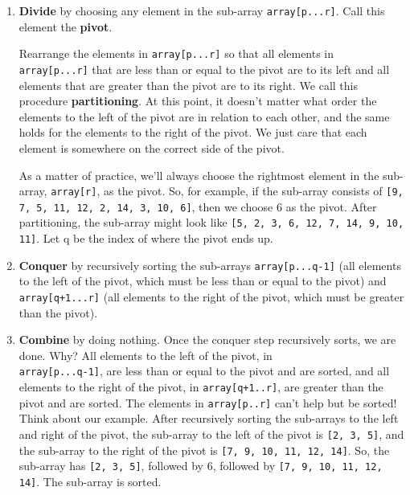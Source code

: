 \documentclass[a4paper,12pt]{article}
\theoremstyle{definition}
\begin{document}
    \begin{enumerate}
        \item
        \textbf{Divide} by choosing any element in the sub-array \texttt{array[p...r]}.
        Call this element the \textbf{pivot}.

        Rearrange the elements in \texttt{array[p...r]} so that all elements in\\ \texttt{array[p...r]} that are less
        than or equal to the pivot are to its left and all elements that are greater than the pivot are to its right.
        We call this procedure \textbf{partitioning}.
        At this point, it doesn't matter what order the elements to the left of the pivot are in relation to each
        other, and the same holds for the elements to the right of the pivot.
        We just care that each element is somewhere on the correct side of the pivot.

        As a matter of practice, we'll always choose the rightmost element in the sub-array, \texttt{array[r]},
        as the pivot.
        So, for example, if the sub-array consists of \texttt{[9, 7, 5, 11, 12, 2, 14, 3, 10, 6]}, then we choose 6
        as the pivot.
        After partitioning, the sub-array might look like \texttt{[5, 2, 3, 6, 12, 7, 14, 9, 10, 11]}.
        Let q be the index of where the pivot ends up.
        \item
        \textbf{Conquer} by recursively sorting the sub-arrays \texttt{array[p...q-1]}
        (all elements to the left of the pivot, which must be less than or equal to the pivot)
        and \texttt{array[q+1...r]} (all elements to the right of the pivot, which must be greater than the pivot).
        \item
        \textbf{Combine} by doing nothing. Once the conquer step recursively sorts, we are done.
        Why? All elements to the left of the pivot, in\\ \texttt{array[p...q-1]}, are less than or equal to the pivot
        and are sorted, and all elements to the right of the pivot, in \texttt{array[q+1..r]}, are greater than the
        pivot and are sorted.
        The elements in \texttt{array[p..r]} can't help but be sorted!
        Think about our example.
        After recursively sorting the sub-arrays to the left and right of the pivot, the sub-array to the left of
        the pivot is \texttt{[2, 3, 5]}, and the sub-array to the right of the pivot is
        \texttt{[7, 9, 10, 11, 12, 14]}.
        So, the sub-array has \texttt{[2, 3, 5]}, followed by 6, followed
        by \texttt{[7, 9, 10, 11, 12, 14]}. The sub-array is sorted.
    \end{enumerate}
\end{document}
